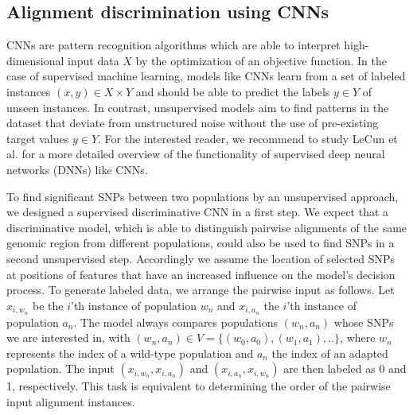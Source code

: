 \documentclass{article}
\begin{document}
\subsection{Alignment discrimination using CNNs}
CNNs are pattern recognition algorithms which are able to interpret high-dimensional input data $X$ by the optimization of an objective function. In the case of supervised machine learning, models like CNNs learn from a set of labeled instances $(x,y)\in X\times Y$ and should be able to predict the labels $y\in Y$ of unseen instances. In contrast, unsupervised models aim to find patterns in the dataset that deviate from unstructured noise without the use of pre-existing target values $y\in Y$. For the interested reader, we recommend to study LeCun et al. \cite{lecun2015deeplearning} for a more detailed overview of the functionality of supervised deep neural networks (DNNs) like CNNs.

To find significant SNPs between two populations by an unsupervised approach, we designed a supervised discriminative CNN in a first step. We expect that a discriminative model, which is able to distinguish pairwise alignments of the same genomic region from different populations, could also be used to find SNPs in a second unsupervised step. Accordingly we assume the location of selected SNPs at positions of features that have an increased influence on the model's decision process. To generate labeled data, we arrange the pairwise input as follows. Let $x_{i,w_{n}}$ be the $i$'th instance of population $w_{n}$ and $x_{i,a_{n}}$ the $i$'th instance of population $a_{n}$. The model always compares populations $(w_{n},a_{n})$ whose SNPs we are interested in, with $(w_{n},a_{n})\in V=\{(w_{0},a_{0}),(w_{1},a_{1}),..\}$, where $w_{n}$ represents the index of a wild-type population and $a_{n}$ the index of an adapted population. The input $(x_{i,w_{n}},x_{i,a_{n}})$ and $(x_{i,a_{n}},x_{i,w_{n}})$ are then labeled as 0 and 1, respectively. This task is equivalent to determining the order of the pairwise input alignment instances.
\end{document}
